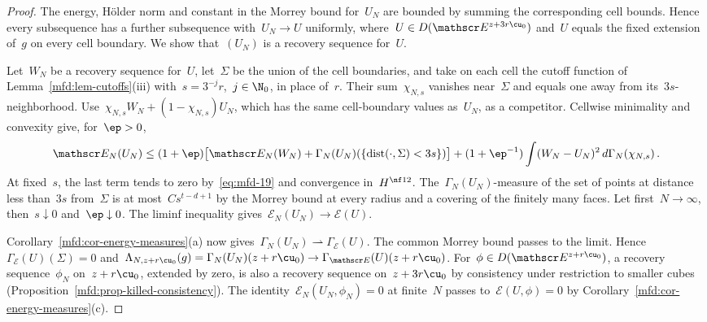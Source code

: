 \documentclass[11pt]{amsart}
\begin{document}
\begin{proof}
The energy, H\"older norm and constant in the Morrey bound for~$U_N$ are bounded by summing the corresponding cell bounds. Hence every subsequence has a further subsequence with~$U_N\to U$ uniformly, where~$U\in D(\mathscr E^{z+3r\cu_0})$ and~$U$ equals the fixed extension of~$g$ on every cell boundary. We show that~$(U_N)$ is a recovery sequence for~$U$.

\smallskip

Let~$W_N$ be a recovery sequence for~$U$, let~$\Sigma$ be the union of the cell boundaries, and take on each cell the cutoff function of Lemma~\ref{mfd:lem-cutoffs}(iii) with~$s=3^{-j}r$,~$j\in\N_0$, in place of~$r$. Their sum~$\chi_{N,s}$ vanishes near~$\Sigma$ and equals one away from its~$3s$-neighborhood. Use~$\chi_{N,s}W_N+(1-\chi_{N,s})U_N$, which has the same cell-boundary values as~$U_N$, as a competitor. Cellwise minimality and convexity give, for~$\ep>0$,
\begin{equation*}
	\mathscr E_N(U_N)
	\leq(1+\ep)\bigl[\mathscr E_N(W_N)
	+\Gamma_N(U_N)(\{\operatorname{dist}(\cdot,\Sigma)<3s\})\bigr]
	+(1+\ep^{-1})
	\int(W_N-U_N)^2\,d\Gamma_N(\chi_{N,s})\,.
\end{equation*}
At fixed~$s$, the last term tends to zero by~\eqref{eq:mfd-19} and convergence in~$H^{\nf12}$. The~$\Gamma_N(U_N)$-measure of the set of points at distance less than~$3s$ from~$\Sigma$ is at most~$Cs^{t-d+1}$ by the Morrey bound at every radius and a covering of the finitely many faces. Let first~$N\to\infty$, then~$s\downarrow0$ and~$\ep\downarrow0$. The liminf inequality gives~$\mathscr E_N(U_N)\to \mathscr E(U)$.

\smallskip

Corollary~\ref{mfd:cor-energy-measures}(a) now gives~$\Gamma_N(U_N)\rightharpoonup\Gamma_{\mathscr E}(U)$. The common Morrey bound passes to the limit. Hence~$\Gamma_{\mathscr E}(U)(\Sigma)=0$ and~$\Lambda_{N,z+r\cu_0}(g)=\Gamma_N(U_N)(z+r\cu_0)\to\Gamma_{\mathscr E}(U)(z+r\cu_0)$. For~$\phi\in D(\mathscr E^{z+r\cu_0})$, a recovery sequence~$\phi_N$ on~$z+r\cu_0$, extended by zero, is also a recovery sequence on~$z+3r\cu_0$ by consistency under restriction to smaller cubes (Proposition~\ref{mfd:prop-killed-consistency}). The identity~$\mathscr E_N(U_N,\phi_N)=0$ at finite~$N$ passes to~$\mathscr E(U,\phi)=0$ by Corollary~\ref{mfd:cor-energy-measures}(c).

\smallskip


\end{proof}
\end{document}
